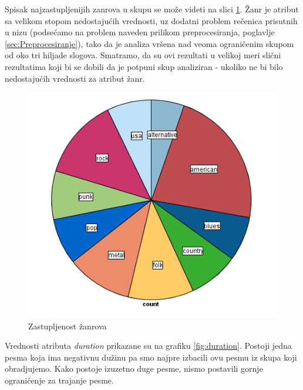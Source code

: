 Spisak najzastupljenijih zanrova u skupu se mo\v{z}e videti na slici \ref{fig:ZastupljenostZanrova}. \v{Z}anr je atribut sa velikom stopom nedostaju\'c{}ih vrednosti, uz dodatni problem re\v{c}enica prisutnih u nizu (podse\'c{}amo na problem naveden prilikom preprocesiranja, poglavlje \ref{sec:Preprocesiranje}), tako da je analiza vr\v{s}ena nad veoma ograni\v{c}enim skupom od oko tri hiljade slogova. Smatramo, da su ovi rezultati u velikoj meri sli\v{c}ni rezultatima koji bi se dobili da je potpuni skup analiziran - ukoliko ne bi bilo nedostaju\'c{}ih vrednosti za atribut \v{z}anr.

\begin{figure}[H]
    \centering
    \includegraphics[scale=0.5]{resources/ZastupljenostZanrova.png}
    \caption{Zastupljenost \v{z}anrova}
    \label{fig:ZastupljenostZanrova}
\end{figure}

Vrednosti atributa \emph{duration} prikazane su na grafiku \ref{fig:duration}. Postoji jedna pesma koja ima negativnu du\v{z}inu pa smo najpre izbacili ovu pesmu iz skupa koji obradjujemo. Kako postoje izuzetno duge pesme, nismo postavili gornje ograni\v{c}enje za trajanje pesme.

